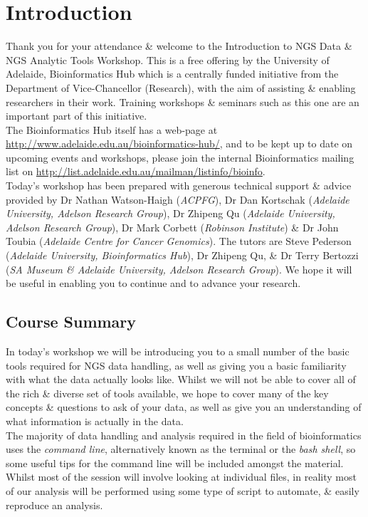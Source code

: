\chapter{Introduction}

Thank you for your attendance \& welcome to the Introduction to NGS Data \& NGS Analytic Tools Workshop.
This is a free offering by the University of Adelaide, Bioinformatics Hub which is a centrally funded initiative from the Department of Vice-Chancellor (Research), with the aim of assisting \& enabling researchers in their work.
Training workshops \& seminars such as this one  are an important part of this initiative. \\

The Bioinformatics Hub itself has a web-page at \url{http://www.adelaide.edu.au/bioinformatics-hub/}, and to be kept up to date on upcoming events and workshops, please join the internal Bioinformatics mailing list on \url{http://list.adelaide.edu.au/mailman/listinfo/bioinfo}.\\

Today's workshop has been prepared with generous technical support \& advice provided by Dr Nathan Watson-Haigh (\textit{ACPFG}), Dr Dan Kortschak (\textit{Adelaide University, Adelson Research Group}), Dr Zhipeng Qu (\textit{Adelaide University, Adelson Research Group}), Dr Mark Corbett (\textit{Robinson Institute}) \& Dr John Toubia (\textit{Adelaide Centre for Cancer Genomics}). 
The tutors are Steve Pederson (\textit{Adelaide University, Bioinformatics Hub}), Dr Zhipeng Qu, \& Dr Terry Bertozzi (\textit{SA Museum \& Adelaide University, Adelson Research Group}). 
We hope it will be useful in enabling you to continue and to advance your research.\\

\section{Course Summary}
In today's workshop we will be introducing you to a small number of the basic tools required for NGS data handling, as well as giving you a basic familiarity with what the data actually looks like.
Whilst we will not be able to cover all of the rich \& diverse set of tools available, we hope to cover many of the key concepts \& questions to ask of your data, as well as give you an understanding of what information is actually in the data.\\


The majority of data handling and analysis required in the field of bioinformatics uses the \textit{command line}, alternatively known as the terminal or the \textit{bash shell}, so some useful tips for the command line will be included amongst the material.
Whilst most of the session will involve looking at individual files, in reality most of our analysis will be performed using some type of script to automate, \& easily reproduce an analysis. \\

